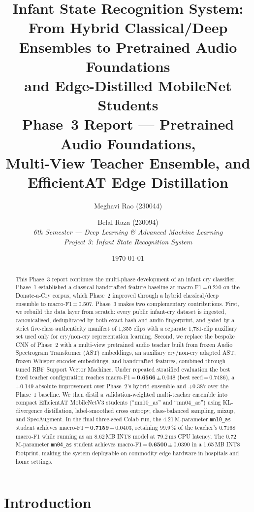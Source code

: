 \documentclass[11pt,a4paper]{article}
\title{%
  \textbf{Infant State Recognition System}:\\[4pt]
  \textbf{From Hybrid Classical/Deep Ensembles to Pretrained Audio Foundations}\\
  \textbf{and Edge-Distilled MobileNet Students}\\[10pt]
  \large Phase~3 Report --- Pretrained Audio Foundations,\\
  \large Multi-View Teacher Ensemble, and EfficientAT Edge Distillation
}
\author{
  Meghavi Rao (230044) \and Belal Raza (230094) \\[4pt]
  \textit{6th Semester --- Deep Learning \& Advanced Machine Learning} \\
  \textit{Project 3: Infant State Recognition System}
}
\date{\today}
\begin{document}
\maketitle

\begin{abstract}
This Phase~3 report continues the multi-phase development of an infant
cry classifier. Phase~1 established a classical handcrafted-feature
baseline at macro-F1\,=\,0.270 on the Donate-a-Cry corpus, which Phase~2
improved through a hybrid classical/deep ensemble to macro-F1\,=\,0.507.
Phase~3 makes two complementary contributions. First, we rebuild the
data layer from scratch: every public infant-cry dataset is ingested,
canonicalised, deduplicated by both exact hash and audio fingerprint, and
gated by a strict five-class authenticity manifest of 1{,}355 clips with
a separate 1{,}781-clip auxiliary set used only for cry/non-cry
representation learning. Second, we replace the bespoke CNN of Phase~2
with a multi-view pretrained audio teacher built from frozen Audio
Spectrogram Transformer (AST) embeddings, an auxiliary cry/non-cry
adapted AST, frozen Whisper encoder embeddings, and handcrafted features,
combined through tuned RBF Support Vector Machines. Under repeated
stratified evaluation the best fixed teacher configuration reaches
macro-F1\,=\,\textbf{0.6566}\,$\pm$\,0.048 (best seed\,=\,0.7486), a
+0.149 absolute improvement over Phase~2's hybrid ensemble and +0.387
over the Phase~1 baseline. We then distil a validation-weighted
multi-teacher ensemble into compact EfficientAT MobileNetV3 students
(``mn10\_as'' and ``mn04\_as'') using KL-divergence distillation,
label-smoothed cross entropy, class-balanced sampling, mixup, and
SpecAugment. In the final three-seed Colab run, the 4.21\,M-parameter
\texttt{mn10\_as} student achieves macro-F1\,=\,\textbf{0.7159}\,$\pm$\,0.0403,
retaining 99.9\,\% of the teacher's 0.7168 macro-F1 while running as an
8.62\,MB INT8 model at 79.2\,ms CPU latency. The 0.72\,M-parameter
\texttt{mn04\_as} student achieves macro-F1\,=\,\textbf{0.6500}\,$\pm$\,0.0390
in a 1.65\,MB INT8 footprint, making the system deployable on commodity
edge hardware in hospitals and home settings.
\end{abstract}

\section{Introduction}
\label{sec:intro}
\end{document}
